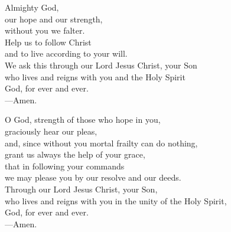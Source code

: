 \prayer


\begin{prayerverse}
Almighty God,\\
our hope and our strength,\\
without you we falter.\\
Help us to follow Christ\\
and to live according to your will.\\
We ask this through our Lord Jesus Christ, your Son\\
who lives and reigns with you and the Holy Spirit\\
God, for ever and ever.\\
{\color{red}---\thinspace}Amen.
\end{prayerverse}


\begin{prayerverse}
O God, strength of those who hope in you,\\
graciously hear our pleas,\\
and, since without you mortal frailty can do nothing,\\
grant us always the help of your grace,\\
that in following your commands\\
we may please you by our resolve and our deeds.\\
Through our Lord Jesus Christ, your Son,\\
who lives and reigns with you in the unity of the Holy Spirit,\\
God, for ever and ever.\\
{\color{red}---\thinspace}Amen.
\end{prayerverse}

